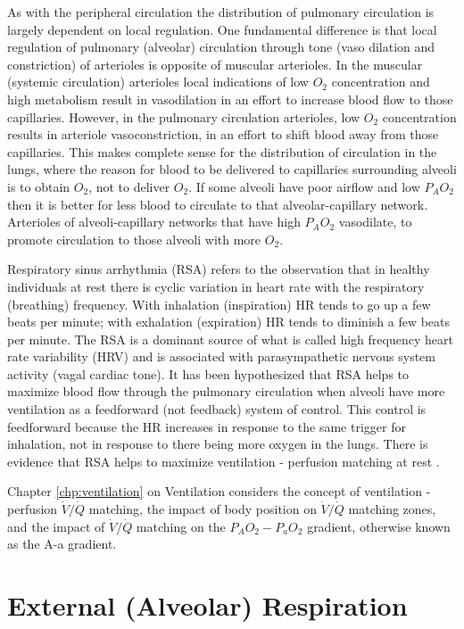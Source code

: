 As with the peripheral circulation the distribution of pulmonary circulation is largely dependent on local regulation. One fundamental difference is that local regulation of pulmonary (alveolar) circulation through tone (vaso dilation and constriction) of arterioles is opposite of muscular arterioles. In the muscular (systemic circulation) arterioles local indications of low $O_2$ concentration and high metabolism result in vasodilation in an effort to increase blood flow to those capillaries. However, in the pulmonary circulation arterioles, low $O_2$ concentration results in arteriole vasoconstriction, in an effort to shift blood away from those capillaries. This makes complete sense for the distribution of circulation in the lungs, where the reason for blood to be delivered to capillaries surrounding alveoli is to obtain $O_2$, not to deliver $O_2$. If some alveoli have poor airflow and low $P_AO_2$ then it is better for less blood to circulate to that alveolar-capillary network. Arterioles of alveoli-capillary networks that have high $P_AO_2$ vasodilate, to promote circulation to those alveoli with more $O_2$.

Respiratory sinus arrhythmia (RSA) refers to the observation that in healthy individuals at rest there is cyclic variation in heart rate with the respiratory (breathing) frequency. With inhalation (inspiration) HR tends to go up a few beats per minute; with exhalation (expiration) HR tends to diminish a few beats per minute. The RSA is a dominant source of what is called high frequency heart rate variability (HRV) and is associated with parasympathetic nervous system activity (vagal cardiac tone). It has been hypothesized that RSA helps to maximize blood flow through the pulmonary circulation when alveoli have more ventilation as a feedforward (not feedback) system of control. This control is feedforward because the HR increases in response to the same trigger for inhalation, not in response to there being more oxygen in the lungs. There is evidence that RSA helps to maximize ventilation - perfusion matching at rest \cite{hayano_hypothesis_2003}.

Chapter \ref{chp:ventilation} on Ventilation considers the concept of ventilation - perfusion $\dot{V}/\dot{Q}$ matching, the impact of body position on $\dot{V}/\dot{Q}$ matching zones, and the impact of $\dot{V}/\dot{Q}$ matching on the $P_AO_2-P_aO_2$ gradient, otherwise known as the A-a gradient.

\section{External (Alveolar) Respiration}

